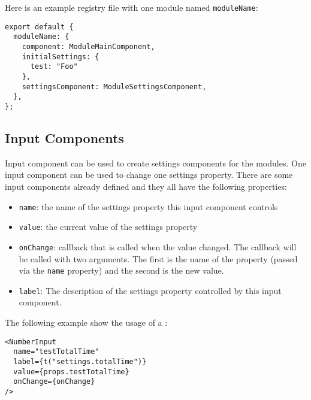 Here is an example registry file with one module named \texttt{moduleName}:
\begin{verbatim}
export default {
  moduleName: {
    component: ModuleMainComponent,
    initialSettings: {
      test: "Foo"
    },
    settingsComponent: ModuleSettingsComponent,
  },
};
\end{verbatim}

\subsection{Input Components}
\label{sec:input-components}
Input component can be used to create settings components for the modules.
One input component can be used to change one settings property.
There are some input components already defined and they all have the following properties:
\begin{itemize}
  \item \texttt{name}: the name of the settings property this input component controls
  \item \texttt{value}: the current value of the settings property
  \item \texttt{onChange}: callback that is called when the value changed. 
    The callback will be called with two arguments.
    The first is the name of the property (passed via the \texttt{name} property) and the second is the new value.
  \item \texttt{label}: The description of the settings property controlled by this input component.
\end{itemize}

The following example show the usage of a :
\begin{verbatim}
<NumberInput
  name="testTotalTime"
  label={t("settings.totalTime")}
  value={props.testTotalTime}
  onChange={onChange}
/> 
\end{verbatim}

